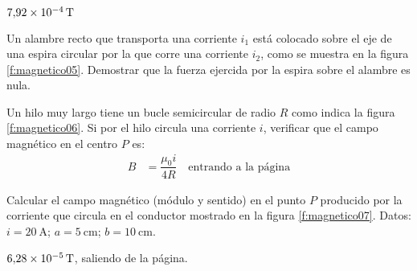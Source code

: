 \begin{Answer}
    $\SI{7.92E-4}{\tesla}$
\end{Answer}
%
\begin{Exercise}\label{p:magnetico05}
    Un alambre recto que transporta una corriente $i_1$ está colocado sobre el eje de una espira circular por la que corre una corriente $i_2$, como se muestra en la figura \ref{f:magnetico05}. Demostrar que la fuerza ejercida por la espira sobre el alambre es nula.
\end{Exercise}
%
\begin{Exercise}\label{p:magnetico06}
    Un hilo muy largo tiene un bucle semicircular de radio $R$ como indica la figura \ref{f:magnetico06}. Si por el hilo circula una corriente $i$, verificar que el campo magnético en el centro $P$ es:
    \begin{align*}
        B &= \dfrac{\mu_0 i}{4R} \quad \text{entrando a la página}
    \end{align*}
\end{Exercise}
%
\begin{Exercise}\label{p:magnetico07}
    Calcular el campo magnético (módulo y sentido) en el punto $P$ producido por la corriente que circula en el conductor mostrado en la figura \ref{f:magnetico07}. Datos: $i = \SI{20}{\ampere}$; $a = \SI{5}{\centi\metre}$; $b = \SI{10}{\centi\metre}$.
\end{Exercise}
\begin{Answer}
    \begin{minipage}[c]{0.4\textwidth}
        $\SI{6.28E-5}{\tesla}$, saliendo de la página.
    \end{minipage}
\end{Answer}
%
\noindent
